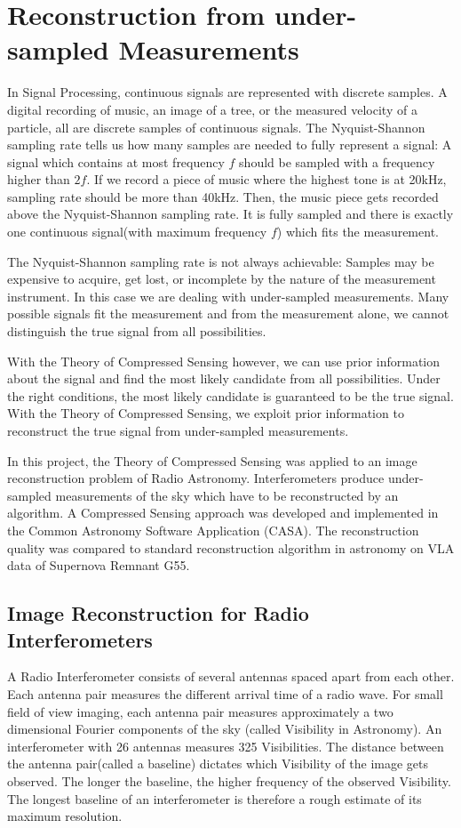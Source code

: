 \section{Reconstruction from under-sampled Measurements}\label{intro}
In Signal Processing, continuous signals are represented with discrete samples. A digital recording of music, an image of a tree, or the measured velocity of a particle, all are discrete samples of continuous signals. The Nyquist-Shannon sampling rate tells us how many samples are needed to fully represent a signal: A signal which contains at most frequency $f$ should be sampled with a frequency higher than $2f$. If we record a piece of music where the highest tone is at 20kHz, sampling rate should be more than 40kHz. Then, the music piece gets recorded above the Nyquist-Shannon sampling rate. It is fully sampled and there is exactly one continuous signal(with maximum frequency $f$) which fits the measurement.

The Nyquist-Shannon sampling rate is not always achievable: Samples may be expensive to acquire, get lost, or incomplete by the nature of the measurement instrument. In this case we are dealing with under-sampled measurements. Many possible signals fit the measurement and from the measurement alone, we cannot distinguish the true signal from all possibilities.

With the Theory of Compressed Sensing\cite{candes2006robust}\cite{donoho2006compressed} however, we can use prior information about the signal and find the most likely candidate from all possibilities. Under the right conditions, the most likely candidate is guaranteed to be the true signal. With the Theory of Compressed Sensing, we exploit prior information to reconstruct the true signal from under-sampled measurements.

In this project, the Theory of Compressed Sensing was applied to an image reconstruction problem of Radio Astronomy. Interferometers produce under-sampled measurements of the sky which have to be reconstructed by an algorithm. A Compressed Sensing approach was developed and implemented in the Common Astronomy Software Application (CASA). The reconstruction quality was compared to standard reconstruction algorithm in astronomy on VLA data of Supernova Remnant G55.


\subsection{Image Reconstruction for Radio Interferometers}
A Radio Interferometer consists of several antennas spaced apart from each other. Each antenna pair measures the different arrival time of a radio wave. For small field of view imaging, each antenna pair measures approximately a two dimensional Fourier components of the sky (called Visibility in Astronomy). An interferometer with 26 antennas measures 325 Visibilities. The distance between the antenna pair(called a baseline) dictates which Visibility of the image gets observed. The longer the baseline, the higher frequency of the observed Visibility. The longest baseline of an interferometer is therefore a rough estimate of its maximum resolution.

